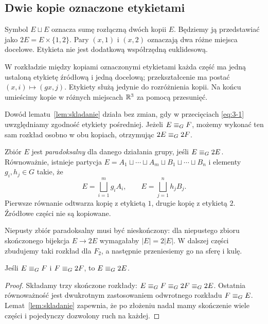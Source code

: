 \subsection{Dwie kopie oznaczone etykietami}
Symbol $E\sqcup E$ oznacza sumę rozłączną dwóch kopii $E$. Będziemy ją przedstawiać jako $2E=E\times\{1,2\}$. Pary $(x,1)$ i $(x,2)$ oznaczają dwa różne miejsca docelowe. Etykieta nie jest dodatkową współrzędną euklidesową.

W rozkładzie między kopiami oznaczonymi etykietami każda część ma jedną ustaloną etykietę źródłową i jedną docelową; przekształcenie ma postać $(x,i)\mapsto(gx,j)$. Etykiety służą jedynie do rozróżnienia kopii. Na końcu umieścimy kopie w różnych miejscach $\mathbb R^3$ za pomocą przesunięć.

Dowód lematu~\ref{lem:skladanie} działa bez zmian, gdy w przecięciach \eqref{eq:3-1} uwzględniamy zgodność etykiety pośredniej. Jeżeli $E\mathrel{\equiv_G} F$, możemy wykonać ten sam rozkład osobno w obu kopiach, otrzymując $2E\mathrel{\equiv_G}2F$.
\begin{definicja}\label{def:paradoksalny}
Zbiór $E$ jest \emph{paradoksalny} dla danego działania grupy, jeśli $E\mathrel{\equiv_G}2E$. Równoważnie, istnieje partycja $E=A_1\sqcup\cdots\sqcup A_m\sqcup B_1\sqcup\cdots\sqcup B_n$ i elementy $g_i,h_j\in G$ takie, że
\[
 E=\bigsqcup_{i=1}^{m}g_iA_i,\qquad E=\bigsqcup_{j=1}^{n}h_jB_j.
\]
Pierwsze równanie odtwarza kopię z etykietą $1$, drugie kopię z etykietą $2$. Źródłowe części nie są kopiowane.
\end{definicja}
Niepusty zbiór paradoksalny musi być nieskończony: dla niepustego zbioru skończonego bijekcja $E\to2E$ wymagałaby $|E|=2|E|$. W dalszej części zbudujemy taki rozkład dla $F_2$, a następnie przeniesiemy go na sferę i kulę.
\begin{wniosek}\label{wn:przenoszenie}
Jeśli $E\mathrel{\equiv_G} F$ i $F\mathrel{\equiv_G}2F$, to $E\mathrel{\equiv_G}2E$.
\end{wniosek}
\begin{proof}
Składamy trzy skończone rozkłady: $E\mathrel{\equiv_G} F\mathrel{\equiv_G}2F\mathrel{\equiv_G}2E$. Ostatnia równoważność jest dwukrotnym zastosowaniem odwrotnego rozkładu $F\mathrel{\equiv_G} E$. Lemat~\ref{lem:skladanie} zapewnia, że po złożeniu nadal mamy skończenie wiele części i pojedynczy dozwolony ruch na każdej.
\end{proof}
